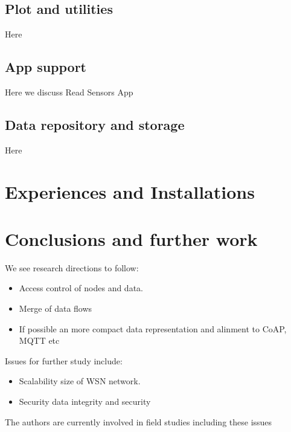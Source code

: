 \documentclass[conference, a4paper,10pt,twocolumn]{IEEEtran}
\begin{document}
\subsection{Plot and utilities}
Here

\subsection{App support}
Here we discuss Read Sensors App  ~\cite{read-sensors}

\subsection{Data repository and storage}
Here

\section{Experiences and Installations}
\label{sec:experince}

\section{Conclusions and further work}
\label{sec:conclusion}

We see research directions to follow:

\begin{itemize}
\item Access control of nodes and data. 

\item Merge of data flows 

\item If possible an more compact data representation and alinment to CoAP, MQTT etc

\end{itemize}

Issues for further study include: 

\begin{itemize}
\item Scalability 
\itemHow size of WSN network.

\item Security
\itemHow data integrity and security

\end{itemize} 

The authors are currently involved in field studies including these issues
\end{document}

